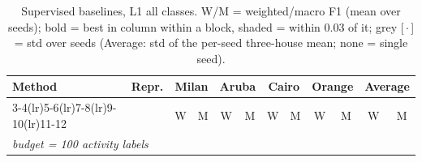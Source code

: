 \begin{table}[H]
\centering\small
\caption{Supervised baselines, L1 all classes. W/M = weighted/macro F1 (mean over seeds); bold = best in column within a block, shaded = within 0.03 of it; grey [\,$\cdot$\,] = std over seeds (Average: std of the per-seed three-house mean; none = single seed).}
\label{tab:base_l1_all}
\setlength{\tabcolsep}{3.2pt}
\begin{tabular}{llcc|cc|cc|cc|cc}
\toprule
Method & Repr. & \multicolumn{2}{c}{Milan} & \multicolumn{2}{c}{Aruba} & \multicolumn{2}{c}{Cairo} & \multicolumn{2}{c}{Orange} & \multicolumn{2}{c}{Average} \\
\cmidrule(lr){3-4}\cmidrule(lr){5-6}\cmidrule(lr){7-8}\cmidrule(lr){9-10}\cmidrule(lr){11-12}
 & & W & M & W & M & W & M & W & M & W & M \\
\midrule
\multicolumn{12}{l}{\textit{budget = 100 activity labels}} \\
\midrule

\end{tabular}
\end{table}
